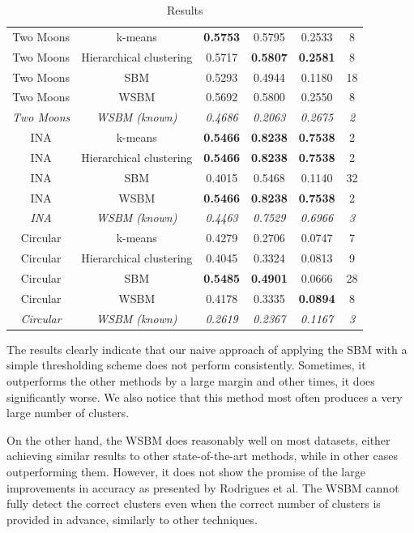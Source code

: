 \documentclass[conference]{IEEEtran}
\begin{document}
\begin{table}[ht]
\begin{tabular}{c | c | c c c | c}
    Two Moons & k-means & \textbf{0.5753} & 0.5795 & 0.2533 & 8 \\
    Two Moons & Hierarchical clustering & 0.5717 & \textbf{0.5807} & \textbf{0.2581} & 8 \\
    Two Moons & SBM & 0.5293 & 0.4944 & 0.1180 & 18 \\
    Two Moons & WSBM & 0.5692 & 0.5800 & 0.2550 & 8 \\
    \textit{Two Moons} & \textit{WSBM (known)} & \textit{0.4686} & \textit{0.2063} & \textit{0.2675} & \textit{2} \\
    \hline
    INA & k-means & \textbf{0.5466} & \textbf{0.8238} & \textbf{0.7538} & 2 \\
    INA & Hierarchical clustering  & \textbf{0.5466} & \textbf{0.8238} & \textbf{0.7538} & 2 \\
    INA & SBM & 0.4015 & 0.5468 & 0.1140 & 32 \\
    INA & WSBM & \textbf{0.5466} & \textbf{0.8238} & \textbf{0.7538} & 2 \\
    \textit{INA} & \textit{WSBM (known)} & \textit{0.4463} & \textit{0.7529} & \textit{0.6966} & \textit{3} \\
    \hline
    Circular & k-means & 0.4279 & 0.2706 & 0.0747 & 7 \\
    Circular & Hierarchical clustering & 0.4045 & 0.3324 & 0.0813 & 9 \\
    Circular & SBM & \textbf{0.5485} & \textbf{0.4901} & 0.0666 & 28 \\
    Circular & WSBM & 0.4178 & 0.3335 & \textbf{0.0894} & 8 \\
    \textit{Circular} & \textit{WSBM (known)} & \textit{0.2619} & \textit{0.2367} & \textit{0.1167} & \textit{3} \\
  \end{tabular}
  \caption{Results}
  \label{tab:results}
\end{table}

The results clearly indicate that our naive approach of applying the SBM with a simple thresholding scheme does not perform consistently. Sometimes, it outperforms the other methods by a large margin and other times, it does significantly worse. We also notice that this method most often produces a very large number of clusters.

On the other hand, the WSBM does reasonably well on most datasets, either achieving similar results to other state-of-the-art methods, while in other cases outperforming them. However, it does not show the promise of the large improvements in accuracy as presented by Rodrigues et al. The WSBM cannot fully detect the correct clusters even when the correct number of clusters is provided in advance, similarly to other techniques.
\end{document}
